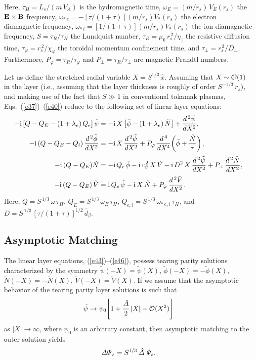 \documentclass[12pt,prb,aps]{revtex4-1}
\begin{document}
Here, 
$\tau_H = L_s/(m\,V_A)$ 
is the  hydromagnetic time, 
$\omega_E =(m/r_s)\,V_E(r_s)$
  the 
 ${\bf E}\times {\bf B}$ frequency, 
$\omega_{\ast\,e} = -[\tau/(1+\tau)](m/r_s)V_\ast(r_s)$
the 
   electron diamagnetic
frequency,
$\omega_{\ast\,i} =[1/(1+\tau)](m/r_s)V_\ast(r_s)$
 the  ion diamagnetic
frequency, 
$S=\tau_R/\tau_H$
 the  Lundquist number, 
$\tau_R = \mu_0\,r_s^{\,2}/\eta_\parallel$
 the
 resistive diffusion time, 
$\tau_\varphi
= r_s^{\,2}/\chi_\varphi$
the  toroidal momentum confinement time, and 
$\tau_\perp = r_s^{\,2}/D_\perp$.
  Furthermore, $P_\varphi = \tau_R/\tau_\varphi$ and $P_\perp = \tau_R/\tau_\perp$ are magnetic Prandtl numbers.

 Let us define the stretched radial variable $X = S^{1/3}\,\hat{x}$.
Assuming that $X\sim{\cal O}(1)$ in the layer (i.e., assuming that the layer thickness is roughly of order $S^{-1/3}\,r_s$),
and making use of the fact that $S\gg 1$ in conventional tokamak plasmas,  Eqs.~(\ref{e37})--(\ref{e40}) reduce to the following
set of linear layer equations:\,\cite{cole}
\begin{align}\label{e43}
-{\rm i}\,[Q-Q_E-(1+\lambda_e)\,Q_{e}]\,\tilde{\psi}&= - {\rm i}\,X\left[\tilde{\phi}-(1+\lambda_e)\,\tilde{N}\right] + \frac{d^{\,2}\tilde{\psi}}{d X^2},\\[0.5ex]
-{\rm i}\,(Q-Q_E -Q_{i})\,\frac{d^{\,2}\tilde{\phi}}{dX^2}&= - {\rm i}\,X\,\frac{d^{\,2}\tilde{\psi}}{dX^2}+ P_\varphi\,\frac{d^{\,4}}{dX^4}\!\left(\tilde{\phi} + \frac{\tilde{N}}{\tau}\right),\\[0.5ex]
-{\rm i}\,(Q-Q_E)\tilde{N} &= - {\rm i}\,Q_{e}\,\tilde{\phi} - {\rm i}\,c_\beta^{\,2}\,X\,\tilde{V}  - {\rm i} \,D^{2}\,X\,\frac{d^{\,2}\tilde{\psi}}{dX^{2}}
+ P_\perp\,\frac{d^{\,2} \tilde{N}}{dX^{2}},\\[0.5ex]
 -{\rm i}\,(Q-Q_E)\,\tilde{V} &= {\rm i}\,Q_{e}\,\tilde{\psi} - {\rm i}\,X\,\tilde{N} + P_\varphi\,\frac{d^{\,2}\tilde{V}}{dX^{2}}.\label{e46}
\end{align}
Here, $Q=S^{\,1/3}\,\omega\,\tau_H$, $Q_E = S^{\,1/3}\,\omega_E\,\tau_H$, $Q_{e,i} = S^{\,1/3}\,\omega_{\ast\,e,i}\,\tau_H$,
and $D = S^{\,1/3}\,[\tau/(1+\tau)]^{1/2}\,\hat{d}_\beta$. 

\subsection{Asymptotic Matching}
The  linear layer equations, (\ref{e43})--(\ref{e46}), possess tearing parity solutions
characterized by the symmetry $\tilde{\psi}(-X)=\tilde\psi(X)$, $\tilde{\phi}(-X)=-\tilde{\phi}(X)$, 
$\tilde{N}(-X)= - \tilde{N}(X)$, $\tilde{V}(-X)=\tilde{V}(X)$. If we assume that
the asymptotic behavior of the tearing parity layer solutions is such that 
\begin{equation}\label{e47}
\tilde{\psi}\rightarrow  \psi_0\!\left[1+ \frac{\hat{\mit\Delta}}{2}\,|X| + {\cal O}(X^2)\right]
\end{equation}
as $|X|\rightarrow\infty$, where $\psi_0$ is an arbitrary constant, then asymptotic matching to the outer solution yields
\begin{equation}\label{e48}
{\mit\Delta\Psi}_s= S^{1/3}\,\hat{\mit\Delta}\,\,{\mit\Psi}_s.
\end{equation}
\end{document}

